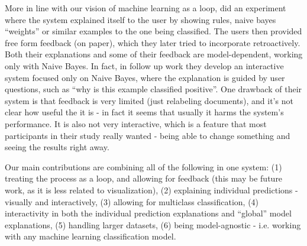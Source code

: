 \documentclass{chi2009}
\begin{document}
More in line with our vision of machine learning as a loop,
\cite{Stumpf:2009:IMM:1555003.1555106} did an experiment where the system
explained itself to the user by showing rules, naive bayes ``weights'' or
similar examples to the one being classified. The users then provided free form
feedback (on paper), which they later tried to incorporate retroactively. Both
their explanations and some of their feedback are model-dependent, working only
with Naive Bayes. In fact, in follow up work
\cite{Kulesza:2011:WED:2030365.2030367} they develop an interactive system
focused only on Naive Bayes, where the explanation is guided by user questions,
such as ``why is this example classified positive''. One drawback of their
system is that feedback is very limited (just relabeling documents), and it's
not clear how useful the it is - in fact it seems that usually it harms the
system's performance. It is also not very interactive, which is a feature that
most participants in their study really wanted - being able to change something
and seeing the results right away. 

Our main contributions are combining all of the following in one system:
(1) treating the process as a loop, and allowing for feedback (this may be
future work, as it is less related to visualization), (2) explaining individual
predictions - visually and interactively, (3) allowing for multiclass
classification, (4) interactivity in both the individual prediction
explanations and ``global'' model explanations, (5) handling larger
datasets, (6) being model-agnostic - i.e. working with any machine learning
classification model.
\pagebreak
\end{document}
